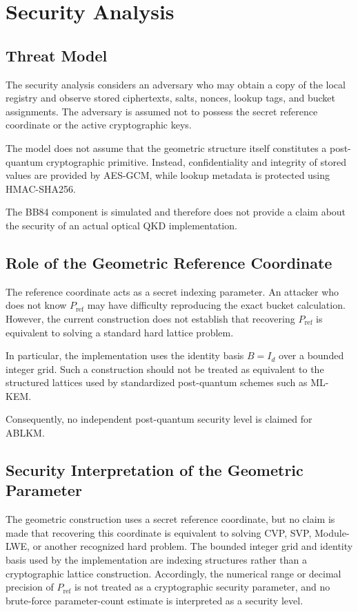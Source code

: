\documentclass[journal,twocolumn]{IEEEtran}
\begin{document}
\section{Security Analysis}

\subsection{Threat Model}

The security analysis considers an adversary who may obtain a copy of the local registry and observe stored ciphertexts, salts, nonces, lookup tags, and bucket assignments. The adversary is assumed not to possess the secret reference coordinate or the active cryptographic keys.

The model does not assume that the geometric structure itself constitutes a post-quantum cryptographic primitive. Instead, confidentiality and integrity of stored values are provided by AES-GCM, while lookup metadata is protected using HMAC-SHA256.

The BB84 component is simulated and therefore does not provide a claim about the security of an actual optical QKD implementation.

\subsection{Role of the Geometric Reference Coordinate}

The reference coordinate acts as a secret indexing parameter. An attacker who does not know $P_{\mathrm{ref}}$ may have difficulty reproducing the exact bucket calculation. However, the current construction does not establish that recovering $P_{\mathrm{ref}}$ is equivalent to solving a standard hard lattice problem.

In particular, the implementation uses the identity basis $B=I_d$ over a bounded integer grid. Such a construction should not be treated as equivalent to the structured lattices used by standardized post-quantum schemes such as ML-KEM.

Consequently, no independent post-quantum security level is claimed for ABLKM.

\subsection{Security Interpretation of the Geometric Parameter}

The geometric construction uses a secret reference coordinate, but no claim is made that recovering this coordinate is equivalent to solving CVP, SVP, Module-LWE, or another recognized hard problem. The bounded integer grid and identity basis used by the implementation are indexing structures rather than a cryptographic lattice construction. Accordingly, the numerical range or decimal precision of $P_{\mathrm{ref}}$ is not treated as a cryptographic security parameter, and no brute-force parameter-count estimate is interpreted as a security level.
\end{document}
